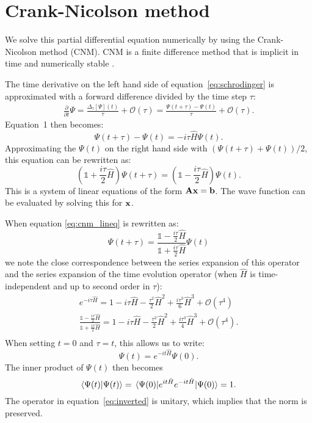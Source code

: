 \section{Crank-Nicolson method}
We solve this partial differential equation numerically by using the Crank-Nicolson method (CNM). CNM is a finite difference method that is implicit in time and numerically stable \cite{cnm}. 

The time derivative on the left hand side of equation~\ref{eq:schrodinger} is approximated with a forward difference divided by the time step $\tau$:
\begin{gather*}
    \frac{\partial}{\partial t}\Psi 
    = \frac{\Delta_\tau[\Psi](t)}{\tau} + \mathcal{O}(\tau)
    = \frac{\Psi(t + \tau) - \Psi(t)}{\tau} + \mathcal{O}(\tau).
\end{gather*} Equation~1 then becomes:
\[
    \Psi(t+\tau)-\Psi(t) 
    = -i\tau\hat{H}\Psi(t).
\] Approximating the $\Psi(t)$ on the right hand side with $\left(\Psi(t+\tau)+\Psi(t)\right)/2$, this equation can be rewritten as:
\begin{equation}\label{eq:cnm_lineq}
    \left(\mathbb{1}+\frac{i\tau}{2}\hat{H}\right)\Psi(t+\tau) 
    = \left(\mathbb{1}-\frac{i\tau}{2}\hat{H}\right)\Psi(t).
\end{equation} This is a system of linear equations of the form $\mathbf{A}\vb{x}=\vb{b}$. The wave function can be evaluated by solving this for $\vb{x}$. 

When equation \ref{eq:cnm_lineq} is rewritten as:
\begin{equation}\label{eq:inverted}
\Psi(t+\tau) 
    = \frac{\mathbb{1}-\frac{i\tau}{2}\hat{H}}{\mathbb{1}+\frac{i\tau}{2}\hat{H}}\Psi(t)
\end{equation} we note the close correspondence between the series expansion of this operator and the series expansion of the time evolution operator (when $\hat{H}$ is time-independent and up to second order in $\tau$):
\begin{gather*}
    e^{-i\tau\hat{H}} 
    = 1 - i \tau\hat{H} - \frac{\tau^2}{2}\hat{H}^2 + \frac{i\tau^3}{6}\hat{H}^3 + \mathcal{O}(\tau^4)\\
    \frac{\mathbb{1}-\frac{i\tau}{2}\hat{H}}{\mathbb{1}+\frac{i\tau}{2}\hat{H}} 
    = 1 - i \tau\hat{H} - \frac{\tau^2}{2}\hat{H}^2 + \frac{i\tau^3}{4}\hat{H}^3 + \mathcal{O}(\tau^4).\\
\end{gather*}
When setting $t=0$ and $\tau=t$, this allows us to write:
\[
    \Psi(t)
    = e^{-it \hat{H}} \Psi(0).
\] The inner product of $\Psi(t)$ then becomes
\[
    \braket{\Psi(t)}{\Psi(t)}
    = \ev*{e^{it\hat{H}} e^{-it\hat{H}}}{\Psi(0)}
    = 1.
\] The operator in equation~\ref{eq:inverted} is unitary, which implies that the norm is preserved.

